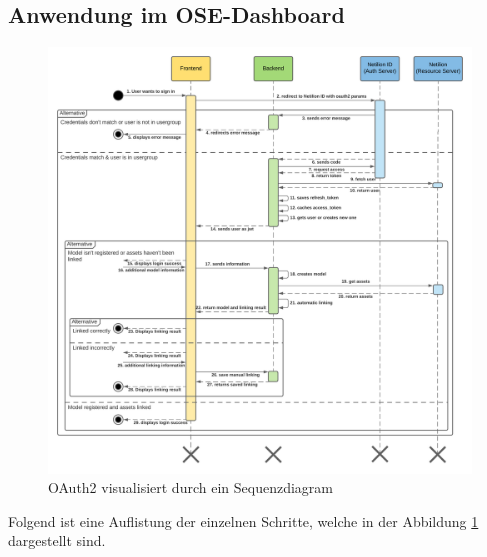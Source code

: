 \subsection{Anwendung im OSE-Dashboard}
\begin{figure}[!ht]
  \centering
  \includegraphics[width=1\linewidth]{./images/OAuth2.png}
  \caption[OAuth2 visualisiert durch ein Sequenzdiagram]{OAuth2 visualisiert durch ein Sequenzdiagram}
  \label{fig:oauth2}
\end{figure}
Folgend ist eine Auflistung der einzelnen Schritte, welche in der Abbildung \ref{fig:oauth2} dargestellt sind.
